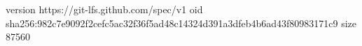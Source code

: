 version https://git-lfs.github.com/spec/v1
oid sha256:982c7e9092f2cefc5ac32f36f5ad48c14324d391a3dfeb4b6ad43f80983171c9
size 87560
